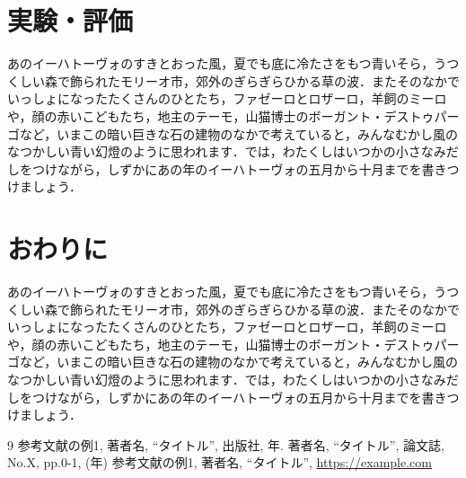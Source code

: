 \section{実験・評価}
あのイーハトーヴォのすきとおった風，夏でも底に冷たさをもつ青いそら，うつくしい森で飾られたモリーオ市，郊外のぎらぎらひかる草の波．またそのなかでいっしょになったたくさんのひとたち，ファゼーロとロザーロ，羊飼のミーロや，顔の赤いこどもたち，地主のテーモ，山猫博士のボーガント・デストゥパーゴなど，いまこの暗い巨きな石の建物のなかで考えていると，みんなむかし風のなつかしい青い幻燈のように思われます．では，わたくしはいつかの小さなみだしをつけながら，しずかにあの年のイーハトーヴォの五月から十月までを書きつけましょう．

\section{おわりに}
あのイーハトーヴォのすきとおった風，夏でも底に冷たさをもつ青いそら，うつくしい森で飾られたモリーオ市，郊外のぎらぎらひかる草の波．またそのなかでいっしょになったたくさんのひとたち，ファゼーロとロザーロ，羊飼のミーロや，顔の赤いこどもたち，地主のテーモ，山猫博士のボーガント・デストゥパーゴなど，いまこの暗い巨きな石の建物のなかで考えていると，みんなむかし風のなつかしい青い幻燈のように思われます．では，わたくしはいつかの小さなみだしをつけながら，しずかにあの年のイーハトーヴォの五月から十月までを書きつけましょう．

\begin{thebibliography}{9}
参考文献の例1, 著者名, ``タイトル'', 出版社, 年.
著者名, ``タイトル'', 論文誌, No.X, pp.0-1, (年)
参考文献の例1, 著者名, ``タイトル'', \url{https://example.com}
\end{thebibliography}